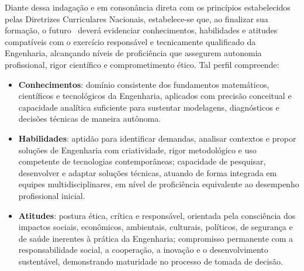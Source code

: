 Diante dessa indagação e em consonância direta com os princípios estabelecidos pelas Diretrizes Curriculares Nacionais, estabelece-se que, ao finalizar sua formação, o futuro \NOMEPROFISSIONAL\ deverá evidenciar conhecimentos, habilidades e atitudes compatíveis com o exercício responsável e tecnicamente qualificado da Engenharia, alcançando níveis de proficiência que assegurem autonomia profissional, rigor científico e comprometimento ético. Tal perfil compreende:

\begin{itemize}
	\item \textbf{Conhecimentos}: domínio consistente dos fundamentos matemáticos, científicos e tecnológicos da Engenharia, aplicados com precisão conceitual e capacidade analítica suficiente para sustentar modelagens, diagnósticos e decisões técnicas de maneira autônoma.
	
	\item \textbf{Habilidades}: aptidão para identificar demandas, analisar contextos e propor soluções de Engenharia com criatividade, rigor metodológico e uso competente de tecnologias contemporâneas; capacidade de pesquisar, desenvolver e adaptar soluções técnicas, atuando de forma integrada em equipes multidisciplinares, em nível de proficiência equivalente ao desempenho profissional inicial.
	
	\item \textbf{Atitudes}: postura ética, crítica e responsável, orientada pela consciência dos impactos sociais, econômicos, ambientais, culturais, políticos, de segurança e de saúde inerentes à prática da Engenharia; compromisso permanente com a responsabilidade social, a cooperação, a inovação e o desenvolvimento sustentável, demonstrando maturidade no processo de tomada de decisão.
\end{itemize}
